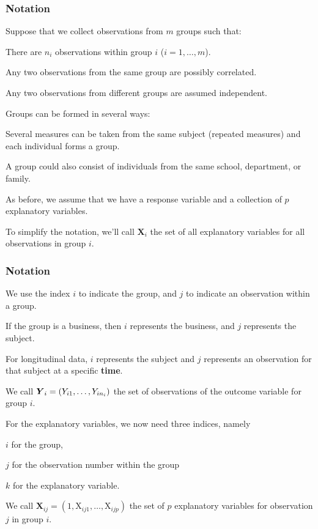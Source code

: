 \documentclass{beamer}
\begin{document}
\begin{frame}
\frametitle{Notation}
\bi
\item Suppose that we collect observations from $m$ groups such that:
\be
\item There are $n_i$ observations within group $i$ ($i=1, \ldots, m$).
\item Any two observations from the same group are possibly correlated.
\item Any two observations from different groups are assumed independent.
\ee
\item Groups can be formed in several ways:
\bi

\item Several measures can be taken from the same subject (repeated measures) and each individual forms a group. 
\item A group could also consist of individuals from the same school, department, or family.
\ei
\item As before, we assume that we have a response variable
 and a collection of $p$ explanatory variables.
\item To simplify the notation, we'll call $\mathbf{X}_i$ the set of all explanatory variables for all observations in group $i$.

\ei
\end{frame}


\begin{frame}
\frametitle{Notation}
\bi
\item We use the index $i$ to indicate the group, and $j$ to indicate an observation within a group.
\bi

\item If the group is a business, then $i$ represents the business, and $j$ represents the subject.
\item For longitudinal data, $i$ represents the subject and $j$ represents an observation for that subject at a specific \textbf{time}.
\ei
\item We call $\boldsymbol {Y}_i=(Y_{i1}, \ldots, Y_{in_i})$ the \alert{set of observations} of the outcome variable for group $i$. 
\item For the explanatory variables, we now need three indices, namely 
\bi \item $i$ for the group,
\item $j$ for the observation number within the group
\item $k$ for the explanatory variable.
\ei
\item We call  $\mathbf{X}_{ij}=(1, \mathrm{X}_{ij1}, \ldots, \mathrm{X}_{ijp})$ the set of $p$ explanatory variables for observation $j$ in group $i$.

\ei
\end{frame}
\end{document}
